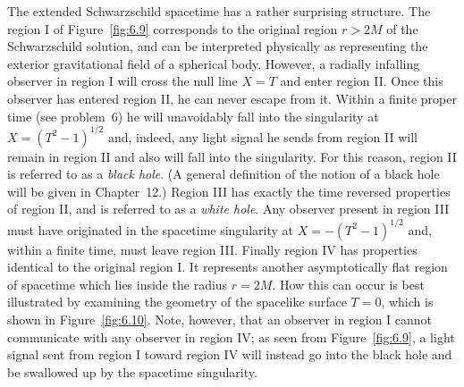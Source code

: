 The extended Schwarzschild spacetime has a rather surprising structure. The
region I of Figure~\ref{fig:6.9} corresponds to the original region \(r>2M\) of
the Schwarzschild solution, and can be interpreted physically as representing the
exterior gravitational field of a spherical body. However, a radially infalling
observer in region I will cross the null line \(X=T\) and enter region II. Once
this observer has entered region II, he can never escape from it. Within a finite
proper time (see problem~6) he will unavoidably fall into the singularity at
\(X=(T^2-1)^{1/2}\) and, indeed, any light signal he sends from region II will
remain in region II and also will fall into the singularity. For this reason,
region II is referred to as a \emph{black hole}. (A general definition of the
notion of a black hole will be given in Chapter~12.) Region III has exactly the
time reversed properties of region II, and is referred to as a \emph{white hole}.
Any observer present in region III must have originated in the spacetime
singularity at \(X=-(T^2-1)^{1/2}\) and, within a finite time, must leave region
III. Finally region IV has properties identical to the original region I. It
represents another asymptotically flat region of spacetime which lies inside the
radius \(r=2M\). How this can occur is best illustrated by examining the geometry
of the spacelike surface \(T=0\), which is shown in Figure~\ref{fig:6.10}. Note,
however, that an observer in region I cannot communicate with any observer in
region IV; as seen from Figure~\ref{fig:6.9}, a light signal sent from region I
toward region IV will instead go into the black hole and be swallowed up by the
spacetime singularity.


